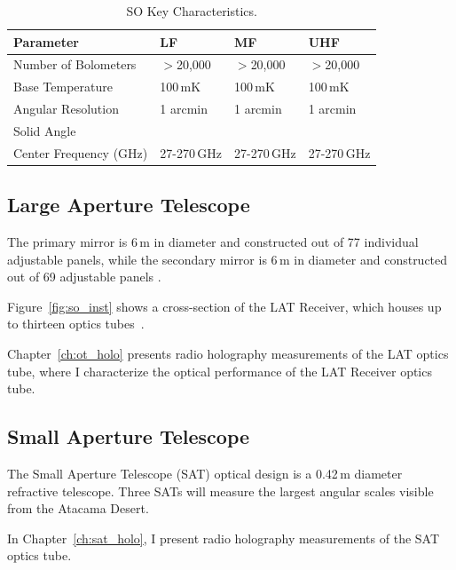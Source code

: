 \begin{table}[ht]
    \centering
    \begin{tabular}{|l|l|l|l|} \hline
        \textbf{ Parameter} &  \textbf{LF} &  \textbf{MF}  &  \textbf{UHF}  \\ \hline \hline
        Number of Bolometers & $>$20,000& $>$20,000& $>$20,000\\\hline
        Base Temperature & 100\,mK & 100\,mK & 100\,mK\\\hline
        Angular Resolution & 1 arcmin &1 arcmin &1 arcmin\\\hline
        Solid Angle & & &\\\hline
        Center Frequency (GHz) & 27-270\,GHz & 27-270\,GHz & 27-270\,GHz\\\hline
    \end{tabular} \caption{SO Key Characteristics.}
    \label{tab:so}
\end{table}

\subsection{Large Aperture Telescope}

The primary mirror is 6\,m in diameter and constructed out of 77 individual adjustable panels, while the secondary mirror is 6\,m in diameter and constructed out of 69 adjustable panels \cite{gali18}.

Figure~\ref{fig:so_inst} shows a cross-section of the LAT Receiver, which houses up to thirteen optics tubes~\cite{Xu_2021}.

Chapter~\ref{ch:ot_holo} presents radio holography measurements of the LAT optics tube, where I characterize the optical performance of the LAT Receiver optics tube.

\subsection{Small Aperture Telescope}

The Small Aperture Telescope (SAT) optical design is a 0.42\,m diameter refractive telescope.  Three SATs will measure the largest angular scales visible from the Atacama Desert.

In Chapter~\ref{ch:sat_holo}, I present radio holography measurements of the SAT optics tube.